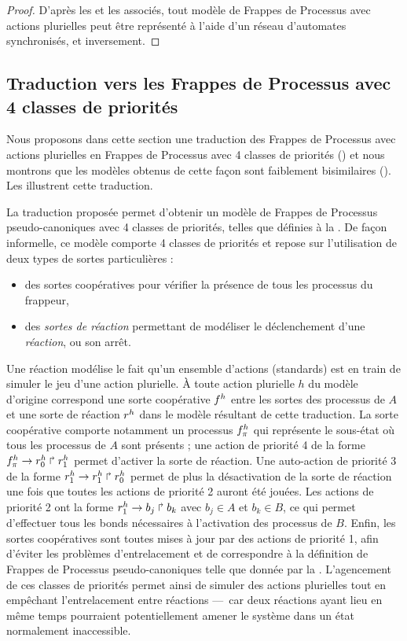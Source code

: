 \begin{proof}
  D'après les  et les 
  associés, tout modèle de Frappes de Processus avec actions plurielles peut être représenté
  à l'aide d'un réseau d'automates synchronisés, et inversement.
\end{proof}



\subsection{Traduction vers les Frappes de Processus avec 4 classes de priorités}

Nous proposons dans cette section une traduction des Frappes de Processus
avec actions plurielles en Frappes de Processus avec 4 classes de priorités ()
et nous montrons que les modèles obtenus de cette façon sont faiblement bisimilaires
().
Les  illustrent cette traduction.

La traduction proposée permet d'obtenir un modèle de
Frappes de Processus pseudo-canoniques avec 4 classes de priorités,
telles que définies à la .
De façon informelle, ce modèle comporte 4 classes de priorités
et repose sur l'utilisation de deux types de sortes particulières :
\begin{itemize}
  \item des sortes coopératives pour vérifier la présence de tous les processus du frappeur,
  \item des \emph{sortes de réaction} permettant de modéliser le déclenchement d'une \emph{réaction},
    ou son arrêt.
\end{itemize}
Une réaction modélise le fait qu'un ensemble d'actions (standards) est en train
de simuler le jeu d'une action plurielle.
À toute action plurielle $h$ du modèle d'origine correspond une sorte coopérative $f^{h}$
entre les sortes des processus de $A$
et une sorte de réaction $r^{h}$ dans le modèle résultant de cette traduction.
La sorte coopérative comporte notamment un processus $f^{h}_\pi$ qui représente le sous-état
où tous les processus de $A$ sont présents ; une action de priorité 4 de la forme
$f^{h}_\pi\rightarrow r^{h}_0\Rsh r^{h}_1$ permet d'activer la sorte de réaction.
Une auto-action de priorité 3 de la forme $r^{h}_1\rightarrow r^{h}_1\Rsh r^{h}_0$
permet de plus la désactivation de la sorte de réaction
une fois que toutes les actions de priorité 2 auront été jouées.
Les actions de priorité 2 ont la forme $r^{h}_1\rightarrow b_j\Rsh b_k$
avec $b_j \in A$ et $b_k \in B$,
ce qui permet d'effectuer tous les bonds nécessaires à l'activation des processus de $B$.
Enfin, les sortes coopératives sont toutes mises à jour par des actions de priorité 1,
afin d'éviter les problèmes d'entrelacement
et de correspondre à la définition de Frappes de Processus pseudo-canoniques
telle que donnée par la .
L'agencement de ces classes de priorités permet ainsi de simuler des actions plurielles
tout en empêchant l'entrelacement entre réactions
---~car deux réactions ayant lieu en même temps pourraient potentiellement
amener le système dans un état normalement inaccessible.

